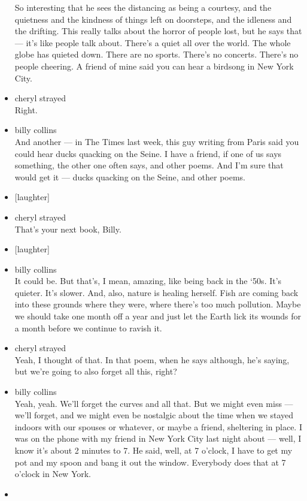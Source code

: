 \begin{itemize}
  So interesting that he sees the distancing as being a courtesy, and
  the quietness and the kindness of things left on doorsteps, and the
  idleness and the drifting. This really talks about the horror of
  people lost, but he says that --- it's like people talk about. There's
  a quiet all over the world. The whole globe has quieted down. There
  are no sports. There's no concerts. There's no people cheering. A
  friend of mine said you can hear a birdsong in New York City.
\item
  cheryl strayed\\
  Right.
\item
  billy collins\\
  And another --- in The Times last week, this guy writing from Paris
  said you could hear ducks quacking on the Seine. I have a friend, if
  one of us says something, the other one often says, and other poems.
  And I'm sure that would get it --- ducks quacking on the Seine, and
  other poems.
\item
  {[}laughter{]}
\item
  cheryl strayed\\
  That's your next book, Billy.
\item
  {[}laughter{]}
\item
  billy collins\\
  It could be. But that's, I mean, amazing, like being back in the `50s.
  It's quieter. It's slower. And, also, nature is healing herself. Fish
  are coming back into these grounds where they were, where there's too
  much pollution. Maybe we should take one month off a year and just let
  the Earth lick its wounds for a month before we continue to ravish it.
\item
  cheryl strayed\\
  Yeah, I thought of that. In that poem, when he says although, he's
  saying, but we're going to also forget all this, right?
\item
  billy collins\\
  Yeah, yeah. We'll forget the curves and all that. But we might even
  miss --- we'll forget, and we might even be nostalgic about the time
  when we stayed indoors with our spouses or whatever, or maybe a
  friend, sheltering in place. I was on the phone with my friend in New
  York City last night about --- well, I know it's about 2 minutes to 7.
  He said, well, at 7 o'clock, I have to get my pot and my spoon and
  bang it out the window. Everybody does that at 7 o'clock in New York.
\item

\end{itemize}
